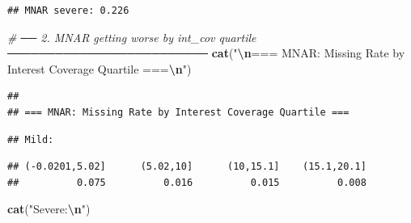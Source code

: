 \documentclass[
]{article}
\newenvironment{Shaded}{\begin{snugshade}}{\end{snugshade}}
\newcommand{\AttributeTok}[1]{\textcolor[rgb]{0.13,0.29,0.53}{#1}}
\newcommand{\CommentTok}[1]{\textcolor[rgb]{0.56,0.35,0.01}{\textit{#1}}}
\newcommand{\DecValTok}[1]{\textcolor[rgb]{0.00,0.00,0.81}{#1}}
\newcommand{\FunctionTok}[1]{\textcolor[rgb]{0.13,0.29,0.53}{\textbf{#1}}}
\newcommand{\NormalTok}[1]{#1}
\newcommand{\OtherTok}[1]{\textcolor[rgb]{0.56,0.35,0.01}{#1}}
\newcommand{\SpecialCharTok}[1]{\textcolor[rgb]{0.81,0.36,0.00}{\textbf{#1}}}
\newcommand{\StringTok}[1]{\textcolor[rgb]{0.31,0.60,0.02}{#1}}
\begin{document}
\begin{verbatim}
## MNAR severe: 0.226
\end{verbatim}

\begin{Shaded}
\begin{Highlighting}[]
\CommentTok{\# ──  2. MNAR getting worse by int\_cov quartile ─────────────────────────}
\FunctionTok{cat}\NormalTok{(}\StringTok{"}\SpecialCharTok{\textbackslash{}n}\StringTok{=== MNAR: Missing Rate by Interest Coverage Quartile ===}\SpecialCharTok{\textbackslash{}n}\StringTok{"}\NormalTok{)}
\end{Highlighting}
\end{Shaded}

\begin{verbatim}
## 
## === MNAR: Missing Rate by Interest Coverage Quartile ===
\end{verbatim}

\begin{Shaded}
\end{Shaded}

\begin{verbatim}
## Mild:
\end{verbatim}

\begin{Shaded}
\end{Shaded}

\begin{verbatim}
## (-0.0201,5.02]      (5.02,10]      (10,15.1]    (15.1,20.1] 
##          0.075          0.016          0.015          0.008
\end{verbatim}

\begin{Shaded}
\begin{Highlighting}[]
\FunctionTok{cat}\NormalTok{(}\StringTok{"Severe:}\SpecialCharTok{\textbackslash{}n}\StringTok{"}\NormalTok{)}
\end{Highlighting}
\end{Shaded}
\end{document}
